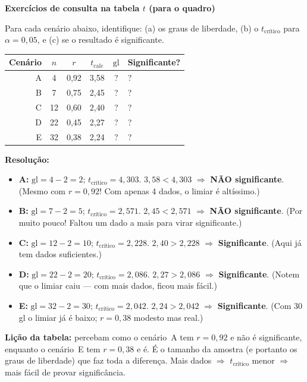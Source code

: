 \begin{BoardBox}
\textbf{Exercícios de consulta na tabela $t$ (para o quadro)}

Para cada cenário abaixo, identifique: (a) os graus de liberdade,
(b) o $t_{\text{crítico}}$ para $\alpha = 0{,}05$, e
(c) se o resultado é significante.

\medskip
\begin{tabular}{|r|c|c|c|c|l|}
\hline
\textbf{Cenário} & $n$ & $r$ & $t_{\text{calc}}$ & $\text{gl}$ & \textbf{Significante?} \\
\hline
A & 4  & 0,92 & 3,58 & ? & ? \\
B & 7  & 0,75 & 2,45 & ? & ? \\
C & 12 & 0,60 & 2,40 & ? & ? \\
D & 22 & 0,45 & 2,27 & ? & ? \\
E & 32 & 0,38 & 2,24 & ? & ? \\
\hline
\end{tabular}

\textbf{Resolução:}
\begin{itemize}
  \item \textbf{A:} $\text{gl} = 4 - 2 = 2$;
  $t_{\text{crítico}} = 4{,}303$.
  $3{,}58 < 4{,}303$ $\Rightarrow$ \textbf{NÃO significante}.
  (Mesmo com $r = 0{,}92$! Com apenas 4 dados, o limiar é altíssimo.)

  \item \textbf{B:} $\text{gl} = 7 - 2 = 5$;
  $t_{\text{crítico}} = 2{,}571$.
  $2{,}45 < 2{,}571$ $\Rightarrow$ \textbf{NÃO significante}.
  (Por muito pouco! Faltou um dado a mais para virar significante.)

  \item \textbf{C:} $\text{gl} = 12 - 2 = 10$;
  $t_{\text{crítico}} = 2{,}228$.
  $2{,}40 > 2{,}228$ $\Rightarrow$ \textbf{Significante}.
  (Aqui já tem dados suficientes.)

  \item \textbf{D:} $\text{gl} = 22 - 2 = 20$;
  $t_{\text{crítico}} = 2{,}086$.
  $2{,}27 > 2{,}086$ $\Rightarrow$ \textbf{Significante}.
  (Notem que o limiar caiu — com mais dados, ficou mais fácil.)

  \item \textbf{E:} $\text{gl} = 32 - 2 = 30$;
  $t_{\text{crítico}} = 2{,}042$.
  $2{,}24 > 2{,}042$ $\Rightarrow$ \textbf{Significante}.
  (Com 30 gl o limiar já é baixo; $r = 0{,}38$ modesto mas real.)
\end{itemize}

\textbf{Lição da tabela:} percebam como o cenário~A tem $r = 0{,}92$ e
não é significante, enquanto o cenário~E tem $r = 0{,}38$ e é.
É o tamanho da amostra (e portanto os graus de liberdade) que faz
toda a diferença. Mais dados $\Rightarrow$ $t_{\text{crítico}}$ menor
$\Rightarrow$ mais fácil de provar significância.
\end{BoardBox}

